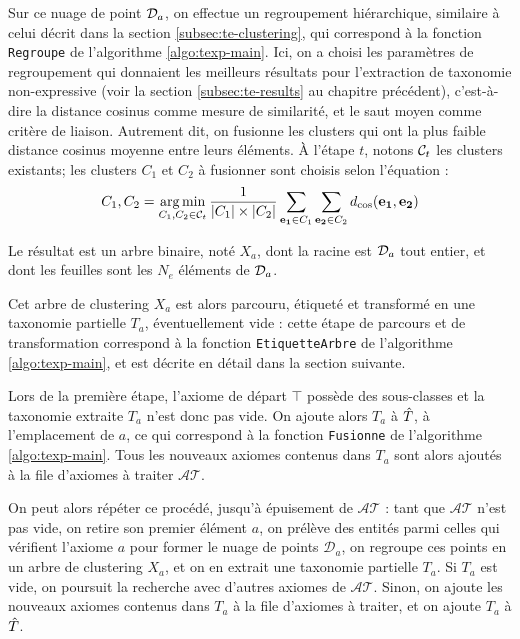 Sur ce nuage de point $\cal{D}_a$, on effectue un regroupement hiérarchique, similaire à celui décrit dans la section \ref{subsec:te-clustering}, qui correspond à la fonction \texttt{Regroupe} de l'algorithme \ref{algo:texp-main}.
Ici, on a choisi les paramètres de regroupement qui donnaient les meilleurs résultats pour l'extraction de taxonomie non-expressive (voir la section \ref{subsec:te-results} au chapitre précédent), c'est-à-dire la distance cosinus comme mesure de similarité, et le saut moyen comme critère de liaison. Autrement dit, on fusionne les clusters qui ont la plus faible distance cosinus moyenne entre leurs éléments. À l'étape $t$, notons $\cal{C}_t$ les clusters existants; les clusters $C_1$ et $C_2$ à fusionner sont choisis selon l'équation :
\begin{equation}
    C_1, C_2 = \argmin_{C_1, C_2 \in \cal{C}_t} \frac{1}{|C_1| \times |C_2|} \sum_{\bf{e_1}\in C_1} \sum_{\bf{e_2} \in C_2} d_\text{cos}(\bf{e_1, e_2})
\end{equation}

Le résultat est un arbre binaire, noté $X_a$, dont la racine est $\cal{D}_a$ tout entier, et dont les feuilles sont les $N_e$ éléments de $\cal{D}_a$. 

Cet arbre de clustering $X_a$ est alors parcouru, étiqueté et transformé en une taxonomie partielle $T_a$, éventuellement vide : cette étape de parcours et de transformation correspond à la fonction \texttt{EtiquetteArbre} de l'algorithme \ref{algo:texp-main}, et est décrite en détail dans la section suivante.

Lors de la première étape, l'axiome de départ $\top$ possède des sous-classes et la taxonomie extraite $T_a$ n'est donc pas vide. On ajoute alors $T_a$ à $\Tpred$, à l'emplacement de $a$, ce qui correspond à la fonction \texttt{Fusionne} de l'algorithme \ref{algo:texp-main}. Tous les nouveaux axiomes contenus dans $T_a$ sont alors ajoutés à la file d'axiomes à traiter $\mathcal{AT}$.

On peut alors répéter ce procédé, jusqu'à épuisement de $\mathcal{AT}$ : tant que $\mathcal{AT}$ n'est pas vide, on retire son premier élément $a$, on prélève des entités parmi celles qui vérifient l'axiome $a$ pour former le nuage de points $\mathcal{D}_a$, on regroupe ces points en un arbre de clustering $X_a$, et on en extrait une taxonomie partielle $T_a$. Si $T_a$ est vide, on poursuit la recherche avec d'autres axiomes de $\mathcal{AT}$. Sinon, on ajoute les nouveaux axiomes contenus dans $T_a$ à la file d'axiomes à traiter, et on ajoute $T_a$ à $\Tpred$.

